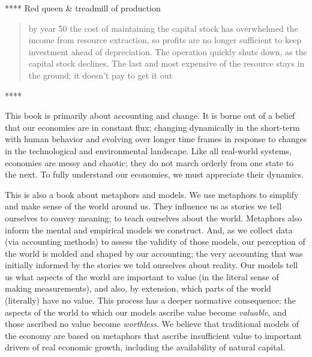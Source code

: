 
****	Red queen \& treadmill of production





\begin{quote}
by year 50 the cost of maintaining the capital stock 
has overwhelmed the income from resource extraction, 
so profits are no longer sufficient to keep investment ahead of depreciation. 
The operation quickly shuts down, as the capital stock declines. 
The last and most expensive of the resource stays in the ground; 
it doesn't pay to get it out~\cite[p.60]{Meadows2008}
\end{quote}
****

This book is primarily about accounting and change.
It is borne out of a belief that our economies are in constant flux;
changing dynamically in the short-term with human behavior
and evolving over longer time frames 
in response to changes in 
the technological and environmental landscape.
Like all real-world systems, 
economies are messy and chaotic;
they do not march orderly from one state to the next.
To fully understand our economies,
we must appreciate their dynamics.

This is also a book about metaphors and models.
We use metaphors to simplify and make sense of the world around us.
They influence us as stories we tell ourselves to convey meaning;
to teach ourselves about the world.
Metaphors also inform 
the mental and empirical models we construct.
And, as we collect data (via accounting methods) 
to assess the validity of those models,
our perception of the world is molded and shaped
by our accounting;
the very accounting that was initially informed
by the stories we told ourselves about reality.
Our models tell us what aspects of the world
are important to value 
(in the literal sense of making measurements),
and also, by extension, 
which parts of the world (literally) have no value.
This process has a deeper normative consequence: 
the aspects of the world to which our models ascribe
value become \emph{valuable},
and those ascribed no value become \emph{worthless}.
We believe that traditional models of the economy
are based on metaphors that ascribe insufficient value 
to important drivers of real economic growth,
including the availability of natural capital.


